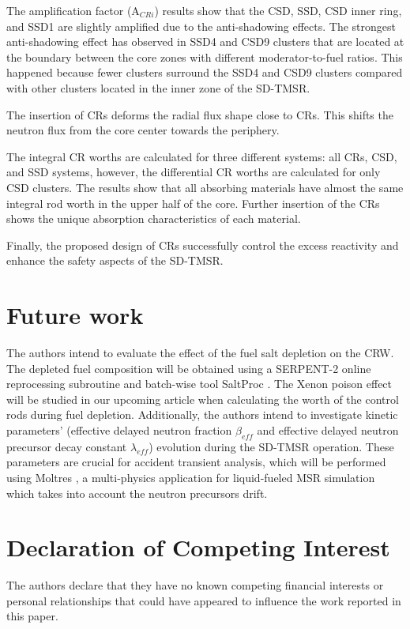The amplification factor (A$_{CRi}$) results show that the CSD, SSD, CSD inner ring, and SSD1 are slightly amplified due to the anti-shadowing effects. The strongest anti-shadowing effect has observed in SSD4 and CSD9 clusters that are located at the boundary between the core zones with different moderator-to-fuel ratios. This happened because fewer clusters surround the SSD4 and CSD9 clusters compared with other clusters located in the inner zone of the SD-TMSR.

The insertion of CRs deforms the radial flux shape close to CRs. This shifts the neutron flux from the core center towards the periphery.

The integral CR worths are calculated for three 
different systems: all CRs, CSD, and SSD systems, however, the differential CR worths are calculated for only CSD clusters. The results show 
that all absorbing materials have almost the same integral rod worth in the 
upper half of the core. Further insertion of the CRs shows the unique 
absorption characteristics of each material.

Finally, the proposed design of CRs successfully control the excess reactivity and enhance the safety aspects of the SD-TMSR.

\section{Future work}
The authors intend to evaluate the effect of the fuel salt 
depletion on the CRW. The depleted fuel composition will be obtained using a
SERPENT-2 online reprocessing subroutine and 
batch-wise tool SaltProc \cite{rykhlevskii_arfc/saltproc_2018}. 
The Xenon poison effect will be studied in our upcoming article when calculating the worth of the control rods during fuel depletion.
Additionally, the authors intend to investigate
kinetic parameters' (effective delayed neutron fraction $\beta_{eff}$ and 
effective delayed neutron precursor decay constant $\lambda_{eff}$) evolution 
during the SD-TMSR operation. These parameters are crucial for accident 
transient analysis, which will be performed using Moltres 
\cite{lindsay_introduction_2018}, a multi-physics application for liquid-fueled MSR 
simulation which takes into account the neutron precursors drift.

\section{Declaration of Competing Interest}

The authors declare that they have no known competing financial interests or personal relationships that could have appeared to influence the work reported in this paper.
